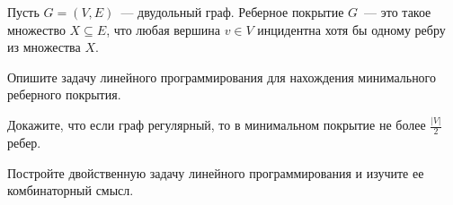 Пусть $G = (V, E)$~--- двудольный граф. Реберное покрытие $G$~--- это такое множество $X \subseteq E$, что любая вершина $v
\in V$ инцидентна хотя бы одному ребру из множества $X$.
\begin{enumcyr}
    \item Опишите задачу линейного программирования для нахождения минимального реберного покрытия.
    \item Докажите, что если граф регулярный, то в минимальном покрытие не более $\frac{|V|}{2}$ ребер.
    \item Постройте двойственную задачу линейного программирования и изучите ее комбинаторный смысл.
\end{enumcyr}
